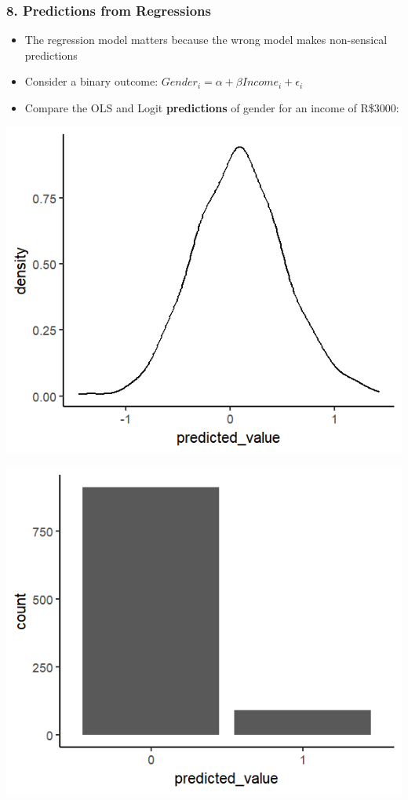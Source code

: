 \documentclass[xcolor=x11names,compress]{beamer}\usepackage[]{graphicx}\usepackage[]{color}
\makeatletter
\def\maxwidth{ %
  \ifdim\Gin@nat@width>\linewidth
    \linewidth
  \else
    \Gin@nat@width
  \fi
}
\newenvironment{knitrout}{}{} %
\renewcommand{\(}{\begin{columns}}
\renewcommand{\)}{\end{columns}}
\newcommand{\<}[1]{\begin{column}{#1}}
\renewcommand{\>}{\end{column}}
\makeatother
\begin{document}
\begin{frame}
\frametitle{8. Predictions from Regressions}
\begin{itemize}
\item The regression model matters because the wrong model makes non-sensical predictions
\item Consider a binary outcome: $Gender_i = \alpha + \beta Income_i + \epsilon_i$
\item Compare the OLS and Logit \textbf{predictions} of gender for an income of R\$3000:
\end{itemize}
\begin{multicols}{2}
\begin{knitrout}
\color{fgcolor}
\includegraphics[width=\maxwidth]{figure/preds_1_ols_chart-1} 

\end{knitrout}
\columnbreak
\begin{knitrout}
\color{fgcolor}
\includegraphics[width=\maxwidth]{figure/preds_1_logit_chart-1} 


\end{knitrout}
\end{multicols}
\end{frame}
\end{document}
